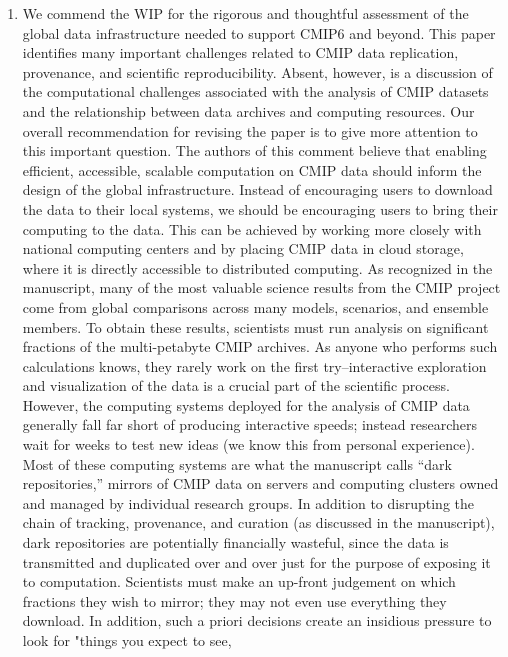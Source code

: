 \documentclass[gmd,manuscript]{copernicus}
\begin{document}
\begin{enumerate}[label=SC1-\arabic*,leftmargin=*]
\item We commend the WIP for the rigorous and thoughtful assessment of
  the global data infrastructure needed to support CMIP6 and beyond.
  This paper identifies many important challenges related to CMIP data
  replication, provenance, and scientific reproducibility. Absent,
  however, is a discussion of the computational challenges associated
  with the analysis of CMIP datasets and the relationship between data
  archives and computing resources. Our overall recommendation for
  revising the paper is to give more attention to this important
  question. The authors of this comment believe that enabling
  efficient, accessible, scalable computation on CMIP data should
  inform the design of the global infrastructure. Instead of
  encouraging users to download the data to their local systems, we
  should be encouraging users to bring their computing to the data.
  This can be achieved by working more closely with national computing
  centers and by placing CMIP data in cloud storage, where it is
  directly accessible to distributed computing. As recognized in the
  manuscript, many of the most valuable science results from the CMIP
  project come from global comparisons across many models, scenarios,
  and ensemble members. To obtain these results, scientists must run
  analysis on significant fractions of the multi-petabyte CMIP
  archives. As anyone who performs such calculations knows, they
  rarely work on the first try–interactive exploration and
  visualization of the data is a crucial part of the scientific
  process. However, the computing systems deployed for the analysis of
  CMIP data generally fall far short of producing interactive speeds;
  instead researchers wait for weeks to test new ideas (we know this
  from personal experience). Most of these computing systems are what
  the manuscript calls “dark repositories,” mirrors of CMIP data on
  servers and computing clusters owned and managed by individual
  research groups. In addition to disrupting the chain of tracking,
  provenance, and curation (as discussed in the manuscript), dark
  repositories are potentially financially wasteful, since the data is
  transmitted and duplicated over and over just for the purpose of
  exposing it to computation. Scientists must make an up-front
  judgement on which fractions they wish to mirror; they may not even
  use everything they download. In addition, such a priori decisions
  create an insidious pressure to look for "things you expect to see,

\end{enumerate}
\end{document}
